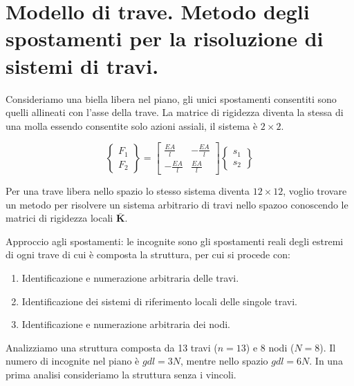 \section{Modello di trave. Metodo degli spostamenti per la risoluzione di sistemi di travi.}

Consideriamo una biella libera nel piano, gli unici spostamenti consentiti sono quelli allineati con l'asse della trave. La matrice di rigidezza diventa la stessa di una molla essendo consentite solo azioni assiali, il sistema è $2\times 2$.

\begin{equation*}
\left\{
\begin{array}{c}
F_{1}\\
F_{2} 
\end{array}
\right\}
=
\begin{bmatrix}
\frac{EA}{l} & -\frac{EA}{l}\\
-\frac{EA}{l} & \frac{EA}{l}
\end{bmatrix}
\left\{
\begin{array}{c}
s_{1} \\
s_{2}
\end{array}
\right\}
\end{equation*}

Per una trave libera nello spazio lo stesso sistema diventa $12\times12$, voglio trovare un metodo per risolvere un sistema arbitrario di travi nello spazoo conoscendo le matrici di rigidezza locali $\boldsymbol{\bar{K}}$.


    Approccio agli spostamenti: le incognite sono gli spostamenti reali degli estremi di ogni trave di cui è composta la struttura, per cui si procede con:
    \begin{enumerate}
        \item Identificazione e numerazione arbitraria delle travi.\\
         \item Identificazione dei sistemi di riferimento locali delle singole travi.\\
          \item Identificazione e numerazione arbitraria dei nodi.\\
    \end{enumerate}


Analizziamo una struttura composta da 13 travi ($n=13$) e 8 nodi ($N=8$). Il numero di incognite nel piano è $gdl = 3N$, mentre nello spazio $gdl = 6N$. In una prima analisi consideriamo la struttura senza i vincoli.

